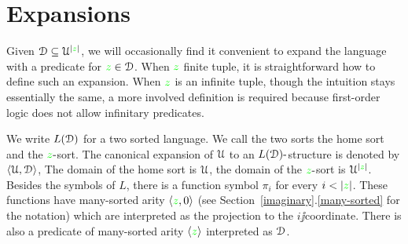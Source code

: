 \documentclass[creche.tex]{subfiles}
\begin{document}
\begin{comment}
La seguente proposizione giustifica la definizione di $p^{(\omega)}$, la dimostrazione \`e immediata.

\begin{proposition}\label{prop_p^omega_Morley}
Sia $p(x)\in S(\U)$ un tipo globale $A\jj$invariante. Allora le seguenti affermazioni sono equivalenti
\begin{itemize}
\item[1.]$\<c_i:i<\omega\>$ \`e una sequenze di Morley di $p$ su $A$;
\item[2.] $\<c_i:i<\omega\>\models p^{(\omega)}|_A$
\end{itemize}
\end{proposition}

La seguente proposizione torner\`a utile nei prossimi paragrafi, si osservi che  non \`e una conseguenza della proposizione~\ref{prop_p^omega_Morley} perch\'e qui l'invarianza su $A$ non \`e tra le ipotesi.

\begin{proposition}
Sia $p(x)\in S(\U)$ un tipo globale invariante ed $A$ un insieme arbitrario. Allora ogni $\<c_i:i<\omega\>\models p^{(\omega)}|_A$ \`e una sequenza di indiscernibili su $A$.
\end{proposition}


\begin{proof}
\`E sufficiente verificare che se $\<c_i:i<\omega\>\models p^{(\omega)}|_A$ allora $c_{i_0},\dots,c_{i_n}\models p^{(n+1)}|_A$ per ogni $i_0<\dots<i_n<\omega$. 
\end{proof}



\end{comment}

\section{Expansions}

Given $\EuScript D\subseteq\EuScript U^{|{\color{green} z}|}$, we will occasionally find it convenient to expand the language with a predicate for ${\color{green} z}\in\EuScript D$. When ${\color{green} z}$ finite tuple, it is straightforward how to define such an expansion. When ${\color{green} z}$ is an infinite tuple, though the intuition stays essentially the same, a more involved definition is required because first-order logic does not allow infinitary predicates.
 
We write \emph{$L(\EuScript D)$\/} for a two sorted language. We call the two sorts the home sort and the ${\color{green} z}\mbox{-}$sort. The canonical expansion of $\EuScript U$ to an $L(\EuScript D)\mbox{-}$structure is denoted by $\langle\EuScript U,\EuScript D\rangle$, The domain of the home sort is $\EuScript U$, the domain of the ${\color{green} z}\mbox{-}$sort is $\EuScript U^{|{\color{green} z}|}$. Besides the symbols of $L$, there is a function symbol $\pi_i$ for every $i<|{\gr z}|$. These functions have many-sorted arity $\langle{\color{green}z},0\rangle$  (see Section~\ref{imaginary}.\ref{many-sorted} for the notation) which are interpreted as the projection to the $i\jj$coordinate. There is also a predicate of many-sorted arity $\langle{\color{green}z}\rangle$ interpreted as $\EuScript D$.
\end{document}
